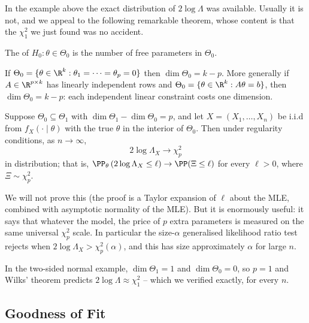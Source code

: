 In the example above the exact distribution of $2\log\Lambda$ was available. Usually it is not, and we appeal to the following remarkable theorem, whose content is that the $\chi^2_1$ we just found was no accident.

\begin{definition}
  The  of $H_0 : \theta \in \Theta_0$ is the number of free parameters in $\Theta_0$.
\end{definition}

\begin{example}
  If $\Theta_0 = \{\theta \in \R^k : \theta_1 = \cdots = \theta_p = 0\}$ then $\dim\Theta_0 = k - p$. More generally if $A \in \R^{p\times k}$ has linearly independent rows and $\Theta_0 = \{\theta \in \R^k : A\theta = b\}$, then $\dim\Theta_0 = k - p$: each independent linear constraint costs one dimension.
\end{example}

\begin{theorem}[Wilks]
  Suppose $\Theta_0 \subseteq \Theta_1$ with $\dim\Theta_1 - \dim\Theta_0 = p$, and let $X = (X_1, \dots, X_n)$ be i.i.d from $f_X(\cdot\mid\theta)$ with the true $\theta$ in the interior of $\Theta_0$. Then under regularity conditions, as $n \to \infty$,
  $$
  2\log\Lambda_X \to \chi^2_p
  $$
  in distribution; that is, $\PP_\theta\left(2\log\Lambda_X \leq \ell\right) \to \PP(\Xi \leq \ell)$ for every $\ell > 0$, where $\Xi \sim \chi^2_p$.
\end{theorem}

We will not prove this (the proof is a Taylor expansion of $\ell$ about the MLE, combined with asymptotic normality of the MLE). But it is enormously useful: it says that whatever the model, the price of $p$ extra parameters is measured on the same universal $\chi^2_p$ scale. In particular the size-$\alpha$ generalised likelihood ratio test rejects when $2\log\Lambda_X > \chi^2_p(\alpha)$, and this has size approximately $\alpha$ for large $n$.

\begin{example}
  In the two-sided normal example, $\dim\Theta_1 = 1$ and $\dim\Theta_0 = 0$, so $p = 1$ and Wilks' theorem predicts $2\log\Lambda \approx \chi^2_1$ -- which we verified exactly, for every $n$.
\end{example}

\subsection{Goodness of Fit}

